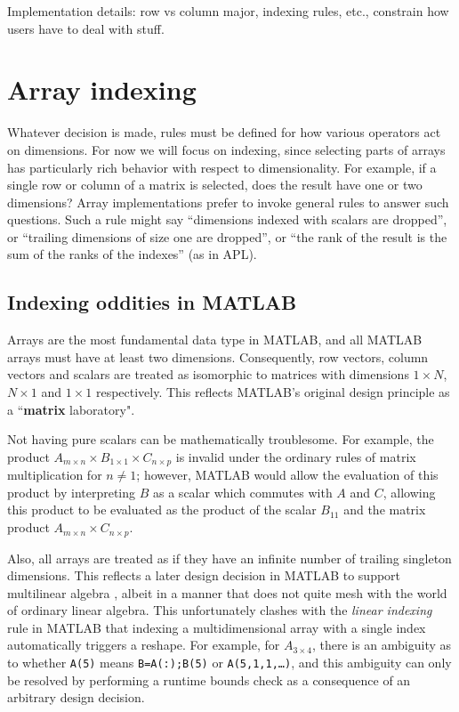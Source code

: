 \documentclass[preprint]{sigplanconf}
\newcommand{\MATLAB}{\textsc{MATLAB}}
\begin{document}
Implementation details: row vs column major, indexing rules, etc., constrain
how users have to deal with stuff.

\section{Array indexing}

Whatever decision is made, rules must be defined for how various operators act
on dimensions. For now we will focus on indexing, since selecting parts of
arrays has particularly rich behavior with respect to dimensionality. For
example, if a single row or column of a matrix is selected, does the result
have one or two dimensions? Array implementations prefer to invoke general
rules to answer such questions. Such a rule might say ``dimensions indexed
with scalars are dropped'', or ``trailing dimensions of size one are
dropped'', or ``the rank of the result is the sum of the ranks of the
indexes'' (as in APL).


\subsection{Indexing oddities in MATLAB}

Arrays are the most fundamental data type in \MATLAB{}, and all \MATLAB{}
arrays must have at least two dimensions. Consequently, row vectors, column
vectors and scalars are treated as isomorphic to matrices with dimensions
$1\times N$, $N\times1$ and $1\times1$ respectively. This reflects \MATLAB's
original design principle as a ``\textbf{matrix} laboratory".

Not having pure scalars can be mathematically troublesome. For example, the
product $A_{m\times n} \times B_{1\times 1} \times C_{n\times p}$ is invalid
under the ordinary rules of matrix multiplication for $n\ne1$; however,
\MATLAB{} would allow the evaluation of this product by interpreting $B$ as a
scalar which commutes with $A$ and $C$, allowing this product to be evaluated
as the product of the scalar $B_{11}$ and the matrix product $A_{m\times n}
\times C_{n\times p}$.


Also, all arrays are treated as if they have an infinite number of trailing
singleton dimensions. This reflects a later design decision in \MATLAB{} to
support multilinear algebra \cite{matlabman:ma, Rose:1999tt},  albeit in a manner that does
not quite mesh with the world of ordinary linear algebra. This unfortunately
clashes with the \textit{linear indexing} rule in \MATLAB{} that indexing a
multidimensional array with a single index automatically triggers a reshape.
For example, for $A_{3\times4}$, there is an ambiguity as to whether
\texttt{A(5)} means \texttt{B=A(:);B(5)} or \texttt{A(5,1,1,\dots)}, and this
ambiguity can only be resolved by performing a runtime bounds check as a
consequence of an arbitrary design decision.
\end{document}

